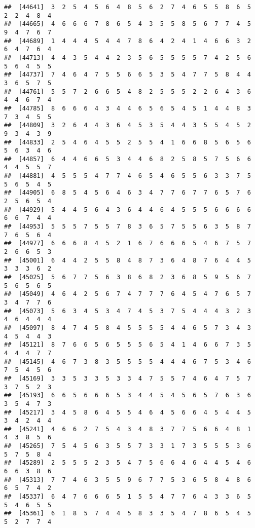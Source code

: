 \documentclass[
]{book}
\begin{document}
\begin{verbatim}
##  [44641]  3  2  5  4  5  6  4  8  5  6  2  7  4  6  5  5  8  6  5  2  2  4  8  4
##  [44665]  4  6  6  6  7  8  6  5  4  3  5  5  8  5  6  7  7  4  5  9  4  7  6  7
##  [44689]  1  4  4  4  5  4  4  7  8  6  4  2  4  1  4  6  6  3  2  6  4  7  6  4
##  [44713]  4  4  3  5  4  4  2  3  5  6  5  5  5  5  7  4  2  5  6  5  6  4  5  5
##  [44737]  7  4  6  4  7  5  5  6  6  5  3  5  4  7  7  5  8  4  4  3  6  5  7  5
##  [44761]  5  5  7  2  6  6  5  4  8  2  5  5  5  2  2  6  4  3  6  4  4  6  7  4
##  [44785]  8  6  6  6  4  3  4  4  6  5  6  5  4  5  1  4  4  8  3  7  3  4  5  5
##  [44809]  3  2  6  4  4  3  6  4  5  3  5  4  4  3  5  5  4  5  2  9  3  4  3  9
##  [44833]  2  5  4  6  4  5  5  2  5  5  4  1  6  6  8  5  6  5  6  5  6  3  4  6
##  [44857]  6  4  4  6  6  5  3  4  4  6  8  2  5  8  5  7  5  6  6  4  4  5  5  7
##  [44881]  4  5  5  5  4  7  7  4  6  5  4  6  5  5  6  3  3  7  5  5  6  5  4  5
##  [44905]  6  8  5  4  5  6  4  6  3  4  7  7  6  7  7  6  5  7  6  2  5  6  5  4
##  [44929]  5  4  4  5  6  4  3  6  4  4  6  4  5  5  5  6  6  6  6  6  6  7  4  4
##  [44953]  5  5  5  7  5  5  7  8  3  6  5  7  5  5  6  3  5  8  7  7  6  5  6  4
##  [44977]  6  6  6  8  4  5  2  1  6  7  6  6  6  5  4  6  7  5  7  2  6  6  5  3
##  [45001]  6  4  4  2  5  5  8  4  8  7  3  6  4  8  7  6  4  4  5  3  3  3  6  2
##  [45025]  5  6  7  7  5  6  3  8  6  8  2  3  6  8  5  9  5  6  7  5  6  5  6  5
##  [45049]  4  6  4  2  5  6  7  4  7  7  7  6  4  5  4  7  6  5  7  3  4  7  7  6
##  [45073]  5  6  3  4  5  3  4  7  4  5  3  7  5  4  4  4  3  2  3  4  6  4  4  4
##  [45097]  8  4  7  4  5  8  4  5  5  5  5  4  4  6  5  7  3  4  3  4  5  4  4  3
##  [45121]  8  7  6  6  5  6  5  5  5  6  5  4  1  4  6  6  7  3  5  4  4  4  7  7
##  [45145]  4  6  7  3  8  3  5  5  5  5  4  4  4  6  7  5  3  4  6  7  5  4  5  6
##  [45169]  3  3  5  3  3  5  3  3  4  7  5  5  7  4  6  4  7  5  7  3  7  5  2  3
##  [45193]  6  6  5  6  6  6  5  3  4  4  5  4  5  6  5  7  6  3  6  3  5  4  7  3
##  [45217]  3  4  5  8  6  4  5  5  4  6  4  5  6  6  4  5  4  4  5  3  4  2  4  4
##  [45241]  4  6  6  2  7  5  4  3  4  8  3  7  7  5  6  6  4  8  1  4  3  8  5  6
##  [45265]  7  5  4  5  6  3  5  5  7  3  3  1  7  3  5  5  5  3  6  5  7  5  8  4
##  [45289]  2  5  5  5  2  3  5  4  7  5  6  6  4  6  4  4  5  4  6  6  6  3  8  6
##  [45313]  7  7  4  6  3  5  5  9  6  7  7  5  3  6  5  8  4  8  6  6  5  7  4  2
##  [45337]  6  4  7  6  6  6  5  1  5  5  4  7  7  6  4  3  3  6  5  5  4  6  5  5
##  [45361]  6  1  8  5  7  4  4  5  8  3  3  5  4  7  8  6  5  4  5  5  2  7  7  4

\end{verbatim}
\end{document}
